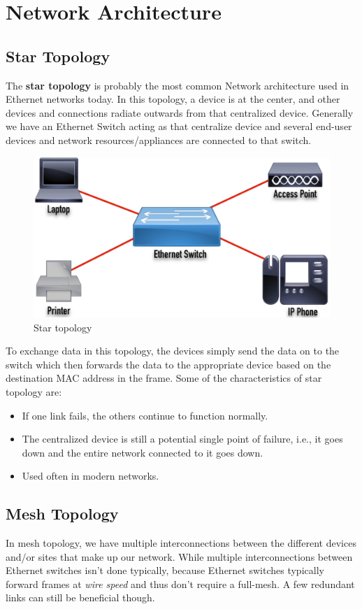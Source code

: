 \chapter{Network Architecture}
\section{Star Topology}
The \textbf{star topology} is probably the most common Network architecture used in Ethernet networks today. In this topology, a device is at the center, and other devices and connections radiate outwards from that centralized device. Generally we have an Ethernet Switch acting as that centralize device and several end-user devices and network resources/appliances are connected to that switch. 

\begin{figure}[H]
	\centering
	\includegraphics[width=0.7\linewidth]{"Mod1/chapters/1.3.a Star topology"}
	\caption{Star topology}
	\label{fig:star_topo}
\end{figure}

\noindent
To exchange data in this topology, the devices simply send the data on to the switch which then forwards the data to the appropriate device based on the destination MAC address in the frame. Some of the characteristics of star topology are:
\vspace{-10pt}
\begin{itemize}
	\item If one link fails, the others continue to function normally.
	\item The centralized device is still a potential single point of failure, i.e., it goes down and the entire network connected to it goes down. 
	\item Used often in modern networks. 
\end{itemize}

\section{Mesh Topology}
In mesh topology, we have multiple interconnections between the different devices and/or sites that make up our network. While multiple interconnections between Ethernet switches isn't done typically, because Ethernet switches typically forward frames at \textit{wire speed} and thus don't require a full-mesh. A few redundant links can still be beneficial though. 

